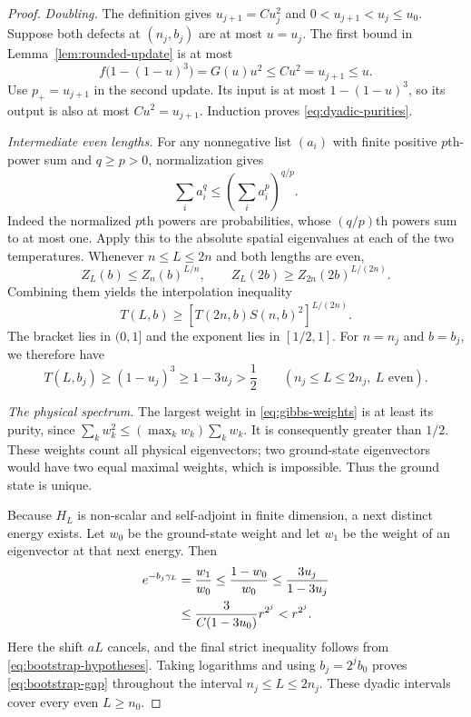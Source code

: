 \begin{proof}
\emph{Doubling.}
The definition gives $u_{j+1}=Cu_j^2$ and
$0<u_{j+1}<u_j\le u_0$.  Suppose both defects at $(n_j,b_j)$ are at
most $u=u_j$.  The first bound in Lemma~\ref{lem:rounded-update} is at
most
\[
 f\bigl(1-(1-u)^3\bigr)=G(u)u^2\le Cu^2=u_{j+1}\le u.
\]
Use $p_+=u_{j+1}$ in the second update.  Its input is at most
$1-(1-u)^3$, so its output is also at most $Cu^2=u_{j+1}$.
Induction proves \eqref{eq:dyadic-purities}.

\emph{Intermediate even lengths.}
For any nonnegative list $(a_i)$ with finite positive $p$th-power sum
and $q\ge p>0$, normalization gives
\[
 \sum_i a_i^q\le\left(\sum_i a_i^p\right)^{q/p}.
\]
Indeed the normalized $p$th powers are probabilities, whose
$(q/p)$th powers sum to at most one.  Apply this to the absolute spatial
eigenvalues at each of the two temperatures.  Whenever $n\le L\le2n$
and both lengths are even,
\[
 Z_L(b)\le Z_n(b)^{L/n},\qquad
 Z_L(2b)\ge Z_{2n}(2b)^{L/(2n)}.
\]
Combining them yields the interpolation inequality
\begin{equation}\label{eq:purity-interpolation}
 T(L,b)\ge
 \left[T(2n,b)S(n,b)^2\right]^{L/(2n)}.
\end{equation}
The bracket lies in $(0,1]$ and the exponent lies in $[1/2,1]$.
For $n=n_j$ and $b=b_j$, we therefore have
\begin{equation}\label{eq:intermediate-purity}
 T(L,b_j)\ge(1-u_j)^3\ge1-3u_j>\frac12
 \qquad(n_j\le L\le2n_j,\ L\text{ even}).
\end{equation}

\emph{The physical spectrum.}
The largest weight in \eqref{eq:gibbs-weights} is at least its purity,
since $\sum_k w_k^2\le(\max_k w_k)\sum_k w_k$.  It is consequently
greater than $1/2$.  These weights count all physical eigenvectors;
two ground-state eigenvectors would have two equal maximal weights,
which is impossible.  Thus the ground state is unique.

Because $H_L$ is non-scalar and self-adjoint in finite dimension, a
next distinct energy exists.  Let $w_0$ be the ground-state weight and
let $w_1$ be the weight of an eigenvector at that next energy.  Then
\begin{align}
 e^{-b_j\gamma_L}
 &=\frac{w_1}{w_0}
 \le\frac{1-w_0}{w_0}
 \le\frac{3u_j}{1-3u_j}\notag\\
 &\le\frac{3}{C(1-3u_0)}r^{2^j}
 <r^{2^j}.
 \label{eq:gap-ratio}
\end{align}
Here the shift $aL$ cancels, and the final strict inequality follows
from \eqref{eq:bootstrap-hypotheses}. Taking logarithms and using
$b_j=2^j b_0$ proves \eqref{eq:bootstrap-gap} throughout the interval
$n_j\le L\le2n_j$.  These dyadic intervals cover every even
$L\ge n_0$.
\end{proof}

